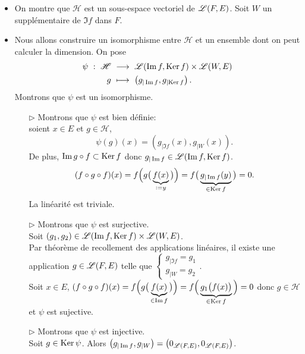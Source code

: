 \begin{solution}
    \begin{itemize}
        \item On montre que $\mathscr{H}$ est un sous-espace vectoriel de $\mathscr{L}(F, E)$. Soit $W$ un supplémentaire de $\Im f$ dans $F$.
        \item Nous allons construire un isomorphisme entre $\mathscr{H}$ et un ensemble dont on peut calculer la dimension. On pose
        \begin{alignat*}{2}
            \psi\ :\ \mathscr{H}\ &\longrightarrow\ \mathscr{L}(\Im f, \mathrm{Ker}\, f) \times \mathscr{L}(W, E)\\
            g\ &\longmapsto\ \left(g_{\vert \Im f}, g_{\vert \mathrm{Ker}\, f} \right).
        \end{alignat*}
        Montrons que $\psi$ est un isomorphisme. 
        \begin{itemize}
            \item[$\rhd$] Montrons que $\psi$ est bien définie: \\
            soient $x \in E$ et $g \in \mathscr{H}$,
            $$\psi(g)(x) = \left( g_{\vert \Im f}(x), g_{\vert W}(x) \right).$$
            De plus, $\Im g \circ f \subset \mathrm{Ker}\, f$ donc $g_{\vert \Im f} \in \mathscr{L}(\Im f, \mathrm{Ker}\, f)$.
            $$(f \circ g \circ f)(x) = f \Big( g \big (\underbrace{f(x)}_{\defeq y} \big ) \Big) = f \big( \underbrace{g_{\vert \Im f}(y)}_{\in \Ker f} \big) = 0.$$
            La linéarité est triviale. 
            \item[$\rhd$] Montrons que $\psi$ est surjective. \\
            Soit $(g_1, g_2) \in \mathscr{L}(\Im f, \mathrm{Ker}\, f) \times \mathscr{L}(W, E)$. \\
            Par théorème de recollement des applications linéaires, il existe une application $g \in \mathscr{L}(F, E)$ telle que 
            $
            \begin{cases}
                    g_{\vert \Im f} = g_1 \\
                    g_{\vert W} = g_2
            \end{cases}
            $. \\
            Soit $x \in E$, $(f \circ g \circ f)(x) = f \Big( g \big(\underbrace{f(x)}_{\in \Im f} \big) \Big) = f \Big( \underbrace{g_1 \big(f(x) \big)}_{\in \mathrm{Ker}\, f} \Big) = 0$ donc $g \in \mathscr{H}$ et $\psi$ est sujective. 
            \item[$\rhd$] Montrons que $\psi$ est injective. \\
            Soit $g \in \mathrm{Ker}\, \psi$. Alors $\left (g_{\vert \Im f}, g_{\vert W} \right) = \left(0_{\mathscr{L}(F, E)}, 0_{\mathscr{L}(F, E)} \right)$. \\

\end{itemize}
\end{itemize}
\end{solution}
